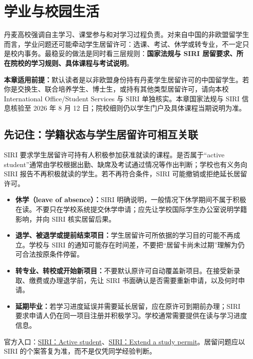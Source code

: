\section{学业与校园生活}\label{sec:academic}

丹麦高校强调自主学习、课堂参与和对学习过程负责。对来自中国的非欧盟留学生而言，学业问题还可能牵动学生居留许可：选课、考试、休学或转专业，不一定只是校内事务。最稳妥的做法是同时看三层规则：\textbf{国家法规与 SIRI 居留要求、所在院校的学习规则、具体课程与考试说明}。

\begin{grayleftbox}
\textbf{本章适用前提：}默认读者是以非欧盟身份持有丹麦学生居留许可的中国留学生。若你是交换生、联合培养学生、博士生，或持有其他类型居留许可，请向本校 International Office/Student Services 与 SIRI 单独核实。本章国家法规与 SIRI 信息核验至 2026 年 8 月 12 日；院校细则仍以学生门户及具体课程当期说明为准。
\end{grayleftbox}

\subsection{先记住：学籍状态与学生居留许可相互关联}

SIRI 要求学生居留许可持有人积极参加获准就读的课程。是否属于“active student”通常由学校根据出勤、缺席及考试通过情况等作出判断；学校也有义务向 SIRI 报告不再积极就读的学生。若不再符合条件，SIRI 可能撤销或拒绝延长居留许可。

\begin{itemize}
  \item \textbf{休学（leave of absence）：}SIRI 明确说明，一般情况下休学期间不属于积极在读。不要只在学校系统提交休学申请；应先让学校国际学生办公室说明学籍影响，并向 SIRI 核实居留后果。
  \item \textbf{退学、被退学或提前结束项目：}学生居留许可所依据的学习目的可能不再成立。学校与 SIRI 的通知可能存在时间差，不要把“居留卡尚未过期”理解为仍可合法按原条件停留。
  \item \textbf{转专业、转校或开始新项目：}不要默认原许可自动覆盖新项目。在接受新录取、缴费或办理退学前，先让 SIRI 书面确认是否需要重新申请，以及何时申请。
  \item \textbf{延期毕业：}若学习进度延误并需要延长居留，应在原许可到期前办理；SIRI 要求申请人仍在同一项目注册并积极学习。学校通常需要提供在读与学习进度信息。
\end{itemize}

官方入口：\href{https://www.nyidanmark.dk/en-GB/Words-and-concepts/SIRI/Active-student}{SIRI：Active student}、\href{https://www.nyidanmark.dk/en-GB/You-want-to-extend/Study---extension/Higher-education}{SIRI：Extend a study permit}。居留问题应以 SIRI 的个案答复为准，而不是仅凭同学经验判断。

